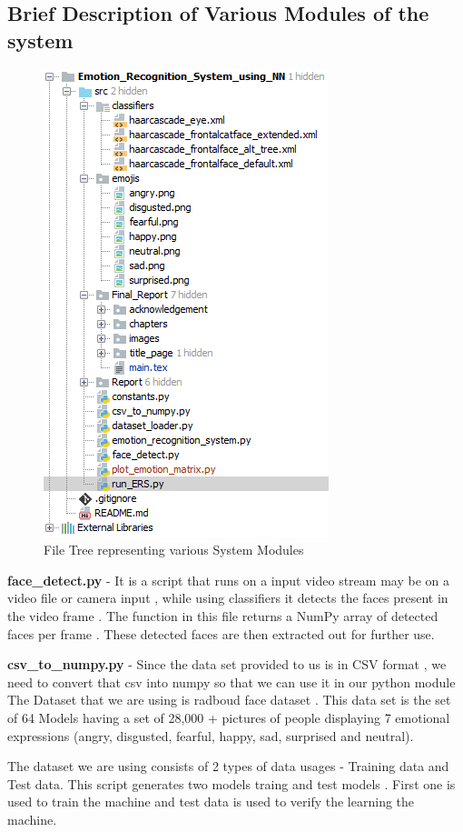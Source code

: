 \subsection{Brief Description of Various Modules of the system}
\begin{figure}[h]
	\centering\includegraphics[scale=1]{images/file_tree.png}
	\caption{File Tree representing various System Modules}
\end{figure}

\textbf{face\_detect.py} - It is a script that runs on a input video stream may be on a video file or camera input , while using classifiers it detects the faces present in the video frame . The function in this file returns a NumPy array of detected faces per frame . These detected faces are then extracted out for further use.

\textbf{csv\_to\_numpy.py} - Since the data set provided to us is in CSV format , we need to convert that csv into numpy so that we can use it in our python module
The Dataset that we are using is radboud face dataset . This data set is the set of 64 Models having a set of 28,000 + pictures of people displaying 7 emotional expressions (angry, disgusted, fearful, happy, sad, surprised and neutral).

The dataset we are using consists of 2 types of data usages  - Training data and Test data. This script generates two models traing and test models . First one is used to train the machine and test data is used to verify the learning the machine.
\pagebreak

